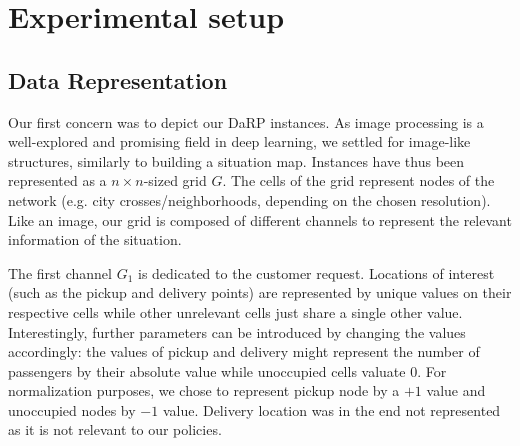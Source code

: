 \documentclass{article}
\begin{document}








\section{Experimental setup}
\subsection{Data Representation}

Our first concern was to depict our DaRP instances.
As image processing is a well-explored and promising field in deep learning, we settled for image-like structures, similarly to building a situation map. 
Instances have thus been represented as a $n\times n$-sized grid $G$.
The cells of the grid represent nodes of the network (e.g. city crosses/neighborhoods, depending on the chosen resolution). 
Like an image, our grid is composed of different channels to represent the relevant information of the situation. 



The first channel $G_1$ is dedicated to the customer request. 
Locations of interest (such as the pickup and delivery points) are represented by unique values on their respective cells while other unrelevant cells just share a single other value.
Interestingly, further parameters can be introduced by changing the values accordingly: 
the values of pickup and delivery might represent the number of passengers by their absolute value while unoccupied cells valuate $0$.
For normalization purposes, we chose to represent pickup node by a $+1$ value and unoccupied nodes by $-1$ value. 
Delivery location was in the end not represented as it is not relevant to our policies.
\end{document}
